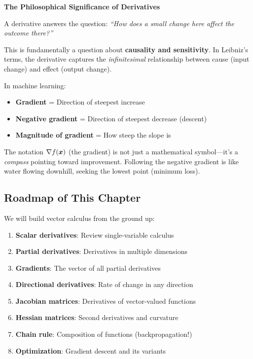 \begin{philobox}
\textbf{The Philosophical Significance of Derivatives}

A derivative answers the question: \textit{``How does a small change here affect the outcome there?''}

This is fundamentally a question about \textbf{causality and sensitivity}. In Leibniz's terms, the derivative captures the \textit{infinitesimal} relationship between cause (input change) and effect (output change).

In machine learning:
\begin{itemize}
    \item \textbf{Gradient} = Direction of steepest increase
    \item \textbf{Negative gradient} = Direction of steepest decrease (descent)
    \item \textbf{Magnitude of gradient} = How steep the slope is
\end{itemize}

The notation $\nabla f(\bm{x})$ (the gradient) is not just a mathematical symbol---it's a \textit{compass} pointing toward improvement. Following the negative gradient is like water flowing downhill, seeking the lowest point (minimum loss).
\end{philobox}

\subsection{Roadmap of This Chapter}

We will build vector calculus from the ground up:

\begin{enumerate}
    \item \textbf{Scalar derivatives}: Review single-variable calculus
    \item \textbf{Partial derivatives}: Derivatives in multiple dimensions
    \item \textbf{Gradients}: The vector of all partial derivatives
    \item \textbf{Directional derivatives}: Rate of change in any direction
    \item \textbf{Jacobian matrices}: Derivatives of vector-valued functions
    \item \textbf{Hessian matrices}: Second derivatives and curvature
    \item \textbf{Chain rule}: Composition of functions (backpropagation!)
    \item \textbf{Optimization}: Gradient descent and its variants
\end{enumerate}

